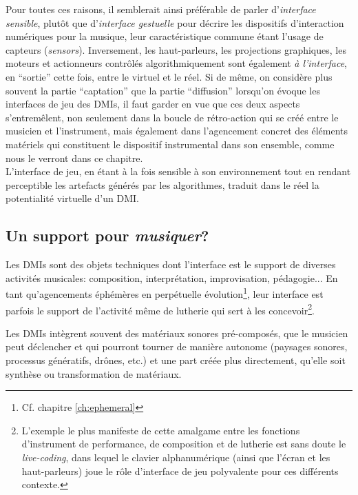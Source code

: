 \indent Pour toutes ces raisons, il semblerait ainsi préférable de parler d'\textit{interface sensible}, plutôt que d'\textit{interface gestuelle} pour décrire les dispositifs d'interaction numériques pour la musique, leur caractéristique commune étant l'usage de capteurs (\textit{sensors}).
\indent Inversement, les haut-parleurs, les projections graphiques, les moteurs et actionneurs contrôlés algorithmiquement sont également \textit{à l'interface}, en ``sortie'' cette fois, entre le virtuel et le réel. Si de même, on considère plus souvent la partie ``captation'' que la partie ``diffusion'' lorsqu'on évoque les interfaces de jeu des \glspl{DMI}, il faut garder en vue que ces deux aspects s'entremêlent, non seulement dans la boucle de rétro-action qui se créé entre le musicien et l'instrument, mais également dans l'agencement concret des éléments matériels qui constituent le dispositif instrumental dans son ensemble, comme nous le verront dans ce chapitre.\\
\indent L'interface de jeu, en étant à la fois sensible à son environnement tout en rendant perceptible les artefacts générés par les algorithmes, traduit dans le réel la potentialité virtuelle d'un \gls{DMI}.


\subsection{Un support pour \textit{musiquer}?}

\noindent Les \glspl{DMI} sont des objets techniques dont l'interface est le support de diverses activités musicales: composition, interprétation, improvisation, pédagogie... En tant qu'agencements éphémères en perpétuelle évolution\footnote{Cf. chapitre \ref{ch:ephemeral}}, leur interface est parfois le support de l'activité même de lutherie qui sert à les concevoir\footnote{L'exemple le plus manifeste de cette amalgame entre les fonctions d'instrument de performance, de composition et de lutherie est sans doute le \textit{live-coding}, dans lequel le clavier alphanumérique (ainsi que l'écran et les haut-parleurs) joue le rôle d'interface de jeu polyvalente pour ces différents contexte.}.

\noindent Les \glspl{DMI} intègrent souvent des matériaux sonores pré-composés, que le musicien peut déclencher et qui pourront tourner de manière autonome (paysages sonores, processus génératifs, drônes, etc.) et une part créée plus directement, qu'elle soit synthèse ou transformation de matériaux.

